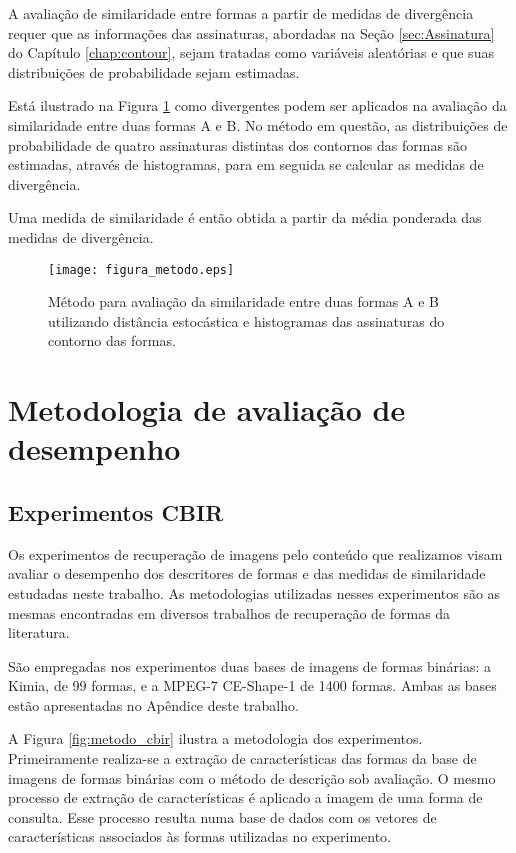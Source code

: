 
A avaliação de similaridade entre formas a partir de medidas de divergência requer que as informações das assinaturas, abordadas na Seção \ref{sec:Assinatura} do Capítulo \ref{chap:contour}, sejam tratadas como variáveis aleatórias e que suas distribuições de probabilidade sejam estimadas. 

Está ilustrado na  Figura \ref{fig:metodo_distancia} como divergentes podem ser aplicados na avaliação da similaridade entre duas formas A e B. No método em questão, as distribuições de probabilidade de quatro assinaturas distintas dos contornos das formas são estimadas, através de histogramas, para em seguida se calcular as medidas de divergência. 

Uma medida de similaridade é então obtida  a partir da média ponderada das medidas de divergência.

\begin{figure}[h!]
  \caption{\label{fig:metodo_distancia} Método para avaliação da similaridade entre duas formas A e B utilizando distância estocástica e histogramas das assinaturas do contorno das formas.}
  \centering
  \texttt{[image: figura\_metodo.eps]}
\end{figure}


\section{Metodologia de avaliação de desempenho}

\subsection{Experimentos CBIR}
Os experimentos de recuperação de imagens pelo conteúdo que realizamos visam avaliar o desempenho dos descritores de formas e das medidas de similaridade estudadas neste trabalho. As metodologias utilizadas nesses experimentos são as mesmas encontradas em diversos trabalhos de recuperação de formas da literatura.

São empregadas nos experimentos duas bases de imagens de formas binárias: a Kimia, de 99 formas, e a MPEG-7 CE-Shape-1 de 1400 formas. Ambas as bases estão apresentadas no Apêndice deste trabalho.

A Figura \ref{fig:metodo_cbir} ilustra a metodologia dos experimentos. Primeiramente realiza-se a extração de características das formas da base de imagens de formas binárias com o método de descrição sob avaliação. O mesmo processo de extração de características é aplicado a imagem de uma forma de consulta. Esse processo resulta numa base de dados com os vetores de características associados às formas utilizadas no experimento. 

